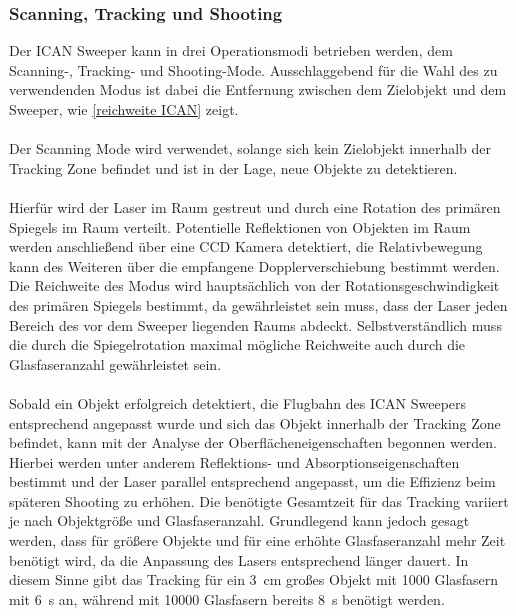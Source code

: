 \documentclass{article}
\begin{document}
\subsubsection{Scanning, Tracking und Shooting}
Der ICAN Sweeper kann in drei Operationsmodi betrieben werden, dem Scanning-, Tracking- und Shooting-Mode. Ausschlaggebend für die Wahl des zu verwendenden Modus ist dabei die Entfernung zwischen dem Zielobjekt und dem Sweeper, wie \autoref{reichweite ICAN} zeigt. \\\\
Der Scanning Mode wird verwendet, solange sich kein Zielobjekt innerhalb der Tracking Zone befindet und ist in der Lage, neue Objekte zu detektieren. \\\\
Hierfür wird der Laser im Raum gestreut und durch eine Rotation des primären Spiegels im Raum verteilt. Potentielle Reflektionen von Objekten im Raum werden anschließend über eine CCD Kamera detektiert, die Relativbewegung kann des Weiteren über die empfangene Dopplerverschiebung bestimmt werden. Die Reichweite des Modus wird hauptsächlich von der Rotationsgeschwindigkeit des primären Spiegels bestimmt, da gewährleistet sein muss, dass der Laser jeden Bereich des vor dem Sweeper liegenden Raums abdeckt. Selbstverständlich muss die durch die Spiegelrotation maximal mögliche Reichweite auch durch die Glasfaseranzahl gewährleistet sein.\\\\
\noindent Sobald ein Objekt erfolgreich detektiert, die Flugbahn des ICAN Sweepers entsprechend angepasst wurde und sich das Objekt innerhalb der Tracking Zone befindet, kann mit der Analyse der Oberflächeneigenschaften begonnen werden. Hierbei werden unter anderem Reflektions- und Absorptionseigenschaften bestimmt und der Laser parallel entsprechend angepasst, um die Effizienz beim späteren Shooting zu erhöhen. Die benötigte Gesamtzeit für das Tracking variiert je nach Objektgröße und Glasfaseranzahl. Grundlegend kann jedoch gesagt werden, dass für größere Objekte und für eine erhöhte Glasfaseranzahl mehr Zeit benötigt wird, da die Anpassung des Lasers entsprechend länger dauert. In diesem Sinne gibt \citet{soulard2014ican} das Tracking für ein \SI{3}{\centi\meter} großes Objekt mit 1000 Glasfasern mit \SI{6}{\second} an, während mit 10000 Glasfasern bereits \SI{8}{\second} benötigt werden.\\\\
\end{document}
